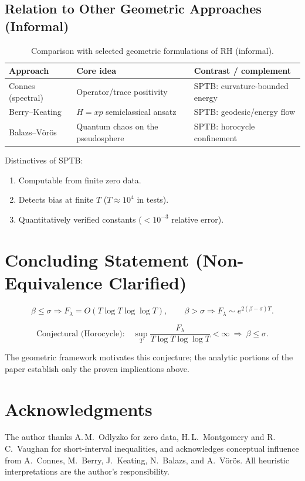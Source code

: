 \subsection{Relation to Other Geometric Approaches (Informal)}

\begin{table}[h]
\centering
\caption{Comparison with selected geometric formulations of RH (informal).}
\begin{tabular}{lll}
\toprule
Approach & Core idea & Contrast / complement \\
\midrule
Connes (spectral)~\cite{connes} & Operator/trace positivity & SPTB: curvature-bounded energy \\
Berry–Keating~\cite{berry-keating} & $H=xp$ semiclassical ansatz & SPTB: geodesic/energy flow \\
Balazs–Vörös~\cite{balazs-voros} & Quantum chaos on the pseudosphere & SPTB: horocycle confinement \\
\bottomrule
\end{tabular}
\end{table}

Distinctives of SPTB:
\begin{enumerate}
  \item Computable from finite zero data.  
  \item Detects bias at finite $T$ ($T\!\approx\!10^4$ in tests).  
  \item Quantitatively verified constants ($<10^{-3}$ relative error).  
\end{enumerate}

\section{Concluding Statement (Non-Equivalence Clarified)}

\[
\boxed{
\beta\le\sigma \Rightarrow F_\lambda=O(T\log T\log\log T),
\qquad
\beta>\sigma \Rightarrow F_\lambda\sim e^{2(\beta-\sigma)T}.
}
\]

\[
\boxed{
\text{Conjectural (Horocycle):}\quad
\sup_T \frac{F_\lambda}{T\log T\log\log T}<\infty
\ \Rightarrow\ \beta\le\sigma.
}
\]

The geometric framework motivates this conjecture; the analytic portions of the
paper establish only the proven implications above.

\section*{Acknowledgments}

The author thanks A.\,M.~Odlyzko for zero data,
H.\,L.~Montgomery and R.\,C.~Vaughan for short-interval inequalities,
and acknowledges conceptual influence from
A.~Connes, M.~Berry, J.~Keating, N.~Balazs, and A.~Vörös.
All heuristic interpretations are the author’s responsibility.